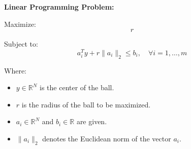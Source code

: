 \documentclass{article}
\begin{document}
\textbf{Linear Programming Problem:}

Maximize:
\[
r
\]

Subject to:
\[
a_i^T y + r \| a_i \|_2 \leq b_i, \quad \forall i = 1, \ldots, m
\]

Where:
\begin{itemize}
    \item \( y \in \mathbb{R}^N \) is the center of the ball.
    \item \( r \) is the radius of the ball to be maximized.
    \item \( a_i \in \mathbb{R}^N \) and \( b_i \in \mathbb{R} \) are given.
    \item \( \| a_i \|_2 \) denotes the Euclidean norm of the vector \( a_i \).
\end{itemize}
\end{document}
